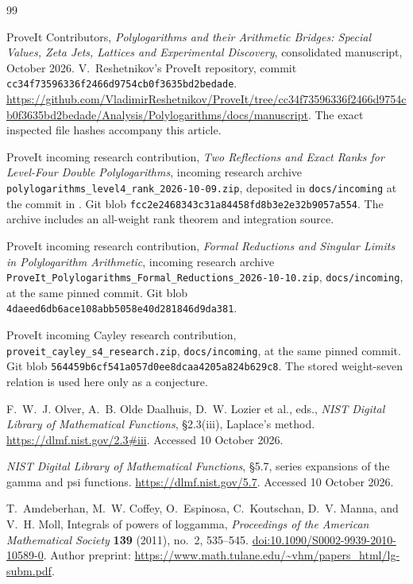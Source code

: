 \documentclass[11pt,a4paper]{article}
\numberwithin{equation}{section}
\theoremstyle{plain}
\theoremstyle{definition}
\theoremstyle{remark}
\newcommand{\src}[1]{\nolinkurl{#1}}
\begin{document}
\begin{thebibliography}{99}
\small
\raggedright

ProveIt Contributors, \emph{Polylogarithms and their Arithmetic
Bridges: Special Values, Zeta Jets, Lattices and Experimental
Discovery}, consolidated manuscript, October 2026.
V.~Reshetnikov's ProveIt repository, commit
\texttt{cc34f73596336f2466d9754cb0f3635bd2bedade}.
\url{https://github.com/VladimirReshetnikov/ProveIt/tree/cc34f73596336f2466d9754cb0f3635bd2bedade/Analysis/Polylogarithms/docs/manuscript}.
The exact inspected file hashes accompany this article.

ProveIt incoming research contribution,
\emph{Two Reflections and Exact Ranks for Level-Four Double Polylogarithms},
incoming research archive
\src{polylogarithms_level4_rank_2026-10-09.zip}, deposited in
\src{docs/incoming} at the commit in \cite{cont:ProveIt}.
Git blob \texttt{fcc2e2468343c31a84458fd8b3e2e32b9057a554}.
The archive includes an all-weight rank theorem and integration source.

ProveIt incoming research contribution,
\emph{Formal Reductions and Singular Limits in Polylogarithm Arithmetic},
incoming research archive
\src{ProveIt_Polylogarithms_Formal_Reductions_2026-10-10.zip},
\src{docs/incoming}, at the same pinned commit.
Git blob \texttt{4daeed6db6ace108abb5058e40d281846d9da381}.

ProveIt incoming Cayley research contribution,
\src{proveit_cayley_s4_research.zip}, \src{docs/incoming},
at the same pinned commit.
Git blob \texttt{564459b6cf541a057d0ee8dcaa4205a824b629c8}.
The stored weight-seven relation is used here only as a conjecture.

F.~W.~J. Olver, A.~B. Olde Daalhuis, D.~W. Lozier et al., eds.,
\emph{NIST Digital Library of Mathematical Functions},
\S2.3(iii), Laplace's method.
\url{https://dlmf.nist.gov/2.3#iii}. Accessed 10 October 2026.

\emph{NIST Digital Library of Mathematical Functions},
\S5.7, series expansions of the gamma and psi functions.
\url{https://dlmf.nist.gov/5.7}. Accessed 10 October 2026.

T.~Amdeberhan, M.~W. Coffey, O.~Espinosa, C.~Koutschan,
D.~V. Manna, and V.~H. Moll, Integrals of powers of loggamma,
\emph{Proceedings of the American Mathematical Society}
\textbf{139} (2011), no.~2, 535--545.
\href{https://doi.org/10.1090/S0002-9939-2010-10589-0}{doi:10.1090/S0002-9939-2010-10589-0}.
Author preprint:
\url{https://www.math.tulane.edu/~vhm/papers_html/lg-subm.pdf}.


\end{thebibliography}
\end{document}
